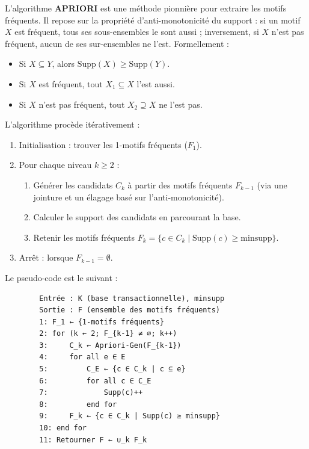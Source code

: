 \documentclass[a4paper,12pt]{report}
\begin{document}
        L’algorithme \textbf{APRIORI} \cite{AS94} est une méthode pionnière pour extraire les motifs fréquents. Il repose sur la propriété d’anti-monotonicité du support : si un motif \( X \) est fréquent, tous ses sous-ensembles le sont aussi ; inversement, si \( X \) n’est pas fréquent, aucun de ses sur-ensembles ne l’est. Formellement :
        \begin{itemize}
            \item Si \( X \subseteq Y \), alors \( \text{Supp}(X) \geq \text{Supp}(Y) \).
            \item Si \( X \) est fréquent, tout \( X_1 \subseteq X \) l’est aussi.
            \item Si \( X \) n’est pas fréquent, tout \( X_2 \supseteq X \) ne l’est pas.
        \end{itemize}
        
        L’algorithme procède itérativement :
        \begin{enumerate}
            \item Initialisation : trouver les 1-motifs fréquents (\( F_1 \)).
            \item Pour chaque niveau \( k \geq 2 \) :
                \begin{enumerate}
                    \item Générer les candidats \( C_k \) à partir des motifs fréquents \( F_{k-1} \) (via une jointure et un élagage basé sur l’anti-monotonicité).
                    \item Calculer le support des candidats en parcourant la base.
                    \item Retenir les motifs fréquents \( F_k = \{c \in C_k \mid \text{Supp}(c) \geq \text{minsupp}\} \).
                \end{enumerate}
            \item Arrêt : lorsque \( F_{k-1} = \emptyset \).
        \end{enumerate}
        
        Le pseudo-code est le suivant :
        \begin{verbatim}
        Entrée : K (base transactionnelle), minsupp
        Sortie : F (ensemble des motifs fréquents)
        1: F_1 ← {1-motifs fréquents}
        2: for (k ← 2; F_{k-1} ≠ ∅; k++)
        3:     C_k ← Apriori-Gen(F_{k-1})
        4:     for all e ∈ E
        5:         C_E ← {c ∈ C_k | c ⊆ e}
        6:         for all c ∈ C_E
        7:             Supp(c)++
        8:         end for
        9:     F_k ← {c ∈ C_k | Supp(c) ≥ minsupp}
        10: end for
        11: Retourner F ← ∪_k F_k
        \end{verbatim}
        
\end{document}
